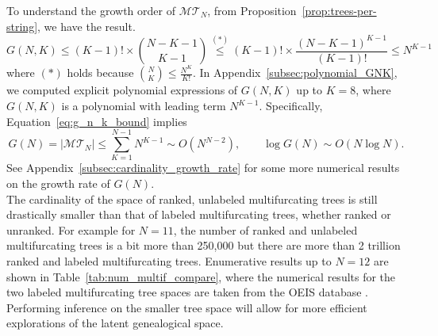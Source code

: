 \documentclass{article}
\begin{document}
To understand the growth order of $\mathcal{MT}_N$, from Proposition~\ref{prop:trees-per-string}, we have the result. 
\begin{equation}\label{eq:g_n_k_bound}
    G(N,K) \leq (K-1)! \times \binom{N-K-1}{K-1} \stackrel{(\ast)}{\leq} (K-1)! \times \frac{(N-K-1)^{K-1}}{(K-1)!} \leq N^{K-1}
\end{equation}
where $(\ast)$ holds because $\binom{N}{K}\leq \frac{N^K}{K!}$. In Appendix~\ref{subsec:polynomial_GNK}, we computed explicit polynomial expressions of $G(N,K)$ up to $K=8$, where $G(N,K)$ is a polynomial with leading term $N^{K-1}$. Specifically, Equation~\ref{eq:g_n_k_bound} implies
\begin{equation}
G(N)= |\mathcal{MT}_N| \leq \sum_{K=1}^{N-1} N^{K-1} \sim O(N^{N-2}), \qquad \log G(N) \sim O(N\log N). 
\end{equation}
See Appendix~\ref{subsec:cardinality_growth_rate} for some more numerical results on the growth rate of $G(N)$. \\

The cardinality of the space of ranked, unlabeled multifurcating trees is still drastically smaller than that of labeled multifurcating trees, whether ranked or unranked. For example for $N=11$, the number of ranked and unlabeled multifurcating trees is a bit more than 250,000 but there are more than 2 trillion ranked and labeled multifurcating trees. Enumerative results up to $N=12$ are shown in Table~\ref{tab:num_multif_compare}, where the numerical results for the two labeled multifurcating tree spaces are taken from the OEIS database \citep{sloane2003line}. Performing inference on the smaller tree space will allow for more efficient explorations of the latent genealogical space.
\end{document}
